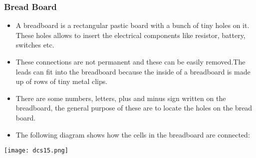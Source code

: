 \documentclass{article}
\begin{document}
\subsubsection{Bread Board}
\begin{itemize}
\item A breadboard is a rectangular pastic board with a bunch of tiny holes on it. These holes allows to insert the electrical components like resistor, battery, switches etc.
\item These connections are not permanent and these can be easily removed.The leads can fit into the breadboard because the inside of a breadboard is made up of rows of tiny metal clips.
\item There are some numbers, letters, plus and minus sign written on the breadboard, the general purpose of these are to locate the holes on the bread board.
\item The following diagram shows how the cells in the breadboard are connected:
\end{itemize}
\texttt{[image: dcs15.png]}
\end{document}

